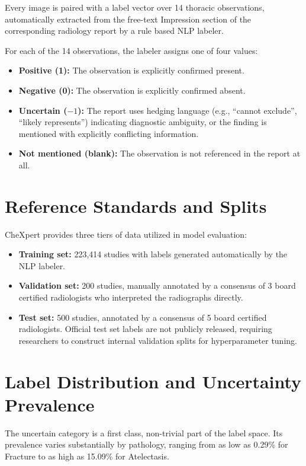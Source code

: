 \documentclass[conference]{IEEEtran}
\begin{document}
Every image is paired with a label vector over 14 thoracic observations, automatically extracted from the free-text Impression section of the corresponding radiology report by a rule based NLP labeler.

For each of the 14 observations, the labeler assigns one of four values:
\begin{itemize}
\item \textbf{Positive (1):} The observation is explicitly confirmed present.
\item \textbf{Negative (0):} The observation is explicitly confirmed absent.
\item \textbf{Uncertain ($-1$):} The report uses hedging language (e.g., ``cannot exclude'', ``likely represents'') indicating diagnostic ambiguity, or the finding is mentioned with explicitly conflicting information.
\item \textbf{Not mentioned (blank):} The observation is not referenced in the report at all.
\end{itemize}

\section{Reference Standards and Splits}
CheXpert provides three tiers of data utilized in model evaluation:
\begin{itemize}
\item \textbf{Training set:} 223,414 studies with labels generated automatically by the NLP labeler.
\item \textbf{Validation set:} 200 studies, manually annotated by a consensus of 3 board certified radiologists who interpreted the radiographs directly.
\item \textbf{Test set:} 500 studies, annotated by a consensus of 5 board certified radiologists. Official test set labels are not publicly released, requiring researchers to construct internal validation splits for hyperparameter tuning.
\end{itemize}

\section{Label Distribution and Uncertainty Prevalence}
The uncertain category is a first class, non-trivial part of the label space. Its prevalence varies substantially by pathology, ranging from as low as 0.29\% for Fracture to as high as 15.09\% for Atelectasis.
\end{document}
